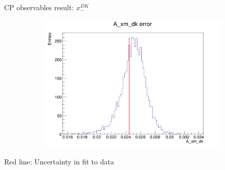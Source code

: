 \documentclass{beamer}
\begin{document}
\begin{frame}{CP observables result: $x_-^{DK}$}
\begin{figure}
\begin{subfigure}{0.42\textwidth}
      \includegraphics[width = 1.0\textwidth]{Plots/A_xm_dk_error_WithDataUncertainty.png}
    \end{subfigure}
  \end{figure}
  \begin{center}
    Red line: Uncertainty in fit to data
  \end{center}
\end{frame}
\end{document}
